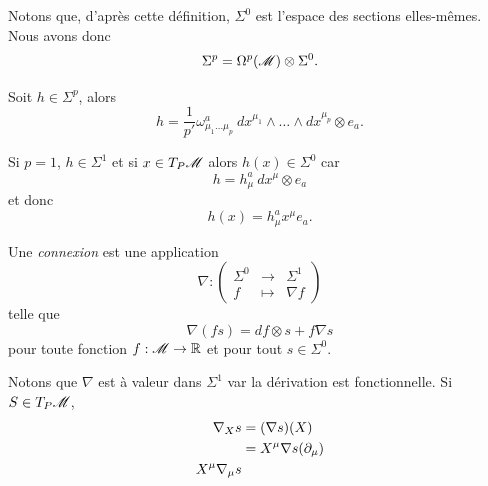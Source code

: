 \documentclass[a4paper,11pt]{report}
\begin{document}
                 Notons que, d'après cette définition, $\Sigma^0$ est l'espace des sections elles-mêmes. Nous avons donc
                 \begin{equation}
                    \Sigma^p = \Omega^p(\mathscr{M})\otimes\Sigma^0.
                \end{equation}
                
                \begin{exmp}
                    Soit $h\in \Sigma^p$, alors
                    \begin{equation}
                        h = \frac{1}{p'}\omega^a_{\mu_1\dots\mu_p}~dx^{\mu_1}\wedge\dots\wedge dx^{\mu_p}\otimes e_a.
                    \end{equation}
                    
                    Si $p=1$, $h\in\Sigma^1$ et si $x\in T_P\mathscr{M}$ alors $h(x)\in\Sigma^0$ car 
                    \begin{equation}
                        h = h^a_\mu~dx^\mu\otimes e_a
                    \end{equation}
                    et donc
                    \begin{equation}
                        h(x) = h^a_\mu x^\mu e_a.
                    \end{equation}
                \end{exmp}
                
                \begin{defn}
                    Une \textit{connexion} est une application
                    \begin{equation}
                    \nabla:\left(
                    \begin{array}{ccc}
                        \Sigma^0 & \longrightarrow & \Sigma^1 \\
                        f & \longmapsto & \nabla f
                    \end{array}
                    \right)
                    \end{equation}
                    telle que 
                    \begin{equation}
                        \nabla(fs) = df\otimes s+f\nabla s
                    \end{equation}
                    pour toute fonction $f:\mathscr{M}\to\mathbb{R}$ et pour tout $s\in\Sigma^0$.
                \end{defn}
                
                Notons que $\nabla$ est à valeur dans $\Sigma^1$ var la dérivation est fonctionnelle. Si $S\in T_P\mathscr{M}$,
                \begin{align}
                    \nabla_X s &= (\nabla s)(X)\\
                    &= X^\mu\nabla s(\partial_\mu)\\
                    X^\mu\nabla_\mu s
                \end{align}
             
\end{document}
